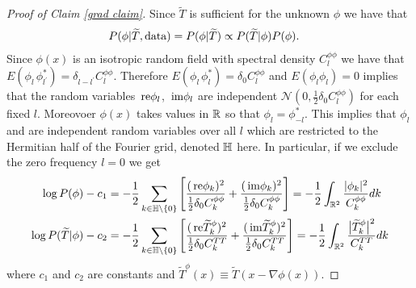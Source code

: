 \documentclass[noinfoline]{imsart}
\newcommand{\re}{\text{\,\rm re}}
\newcommand{\im}{\text{\,\rm im}}
\begin{document}
\begin{proof}[{ Proof of Claim \ref{grad claim}}]
Since $\widetilde T$ is sufficient for the unknown $\phi$ we have that 
\begin{align*}
P(\phi|\widetilde T, \text{\rm data}) &= P(\phi|\widetilde T)\propto P(\widetilde T|\phi)P(\phi).
\end{align*}
Since $\phi(x)$ is an isotropic random field with spectral density $C_l^{\phi\phi}$ we have that $E(\phi^{\phantom{*}}_l \phi_{l^\prime}^*) = \delta_{l - l^\prime}C_l^{\phi\phi}$. 
Therefore  $E(\phi_l^{\phantom{*}}\phi_l^*) = \delta_{0}C_l^{\phi\phi}$ and $E(\phi_l\phi_{l}) = 0$ implies that the random variables $\re \phi_l$, $\im \phi_l$ are independent $\mathcal N(0, \frac{1}{2}\delta_0 C_l^{\phi\phi})$ for each fixed $l$.
Moreovoer  $\phi(x)$ takes values in $\Bbb R$ so that  $\phi_l = \phi_{-l}^*$.  This implies 
that $\phi_l$ and are independent random variables over all $l$ which are restricted to the Hermitian half of the Fourier grid, denoted $\Bbb H$ here. In particular,  if we exclude the zero frequency $l = 0$ we get
\begin{align}
\log P(\phi) - c_1 &=  - \frac{1}{2}\sum_{k \in \Bbb H\setminus \{0 \}}  \left[\frac{(\re \phi_k)^2}{\frac{1}{2}\delta_0 C_k^{\phi\phi}} +  \frac{(\im \phi_k)^2}{\frac{1}{2}\delta_0 C_k^{\phi\phi}} \right] = - \frac{1}{2}\int_{\Bbb R^2} \frac{|\phi_k|^2}{C_k^{\phi\phi}} dk \label{dr1} \\
\log P(\widetilde T| \phi) - c_2 &=  - \frac{1}{2}\sum_{k \in \Bbb H\setminus \{0 \}}  \left[\frac{(\re \widetilde T_k^\phi)^2}{\frac{1}{2}\delta_0 C_k^{TT}} +  \frac{(\im \widetilde T_k^\phi)^2}{\frac{1}{2}\delta_0 C_k^{TT}} \right] = - \frac{1}{2}\int_{\Bbb R^2} \frac{\bigl|\widetilde T_k^\phi\bigr|^2}{C_k^{TT}} dk \label{dr2}
\end{align}
where $c_1$ and $c_2$ are constants and  $\widetilde T^\phi(x)\equiv \widetilde T(x-\nabla \phi(x))$.


\end{proof}
\end{document}
